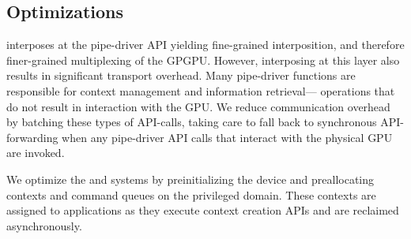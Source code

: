 \subsection{Optimizations}
\label{sec:optimizations}
\trillium interposes at the pipe-driver API yielding fine-grained interposition,
and therefore finer-grained multiplexing of the GPGPU.
However, interposing at this layer also results in significant transport overhead.
Many pipe-driver functions are responsible for context management and information retrieval---%
operations that do not result in interaction with the GPU.
We reduce communication overhead by batching these types of API-calls, taking care to
fall back to synchronous API-forwarding when any pipe-driver API calls that interact
with the physical GPU are invoked.


We optimize the \apigpu and \apicpu systems by preinitializing the device and
preallocating contexts and command queues
on the privileged domain.
These contexts are assigned to applications as they execute context creation APIs and are reclaimed asynchronously.